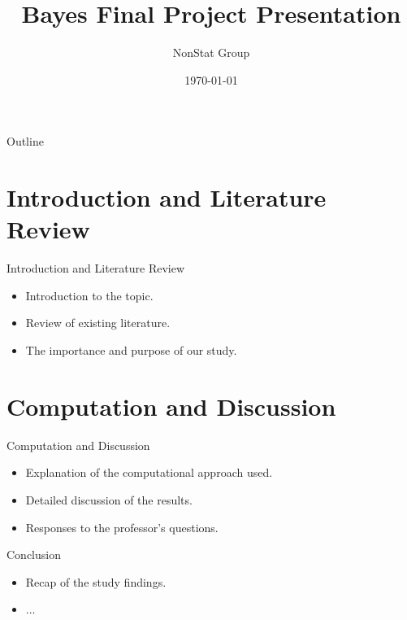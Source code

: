 \documentclass{beamer}
\title[Final Presentation]{Bayes Final Project Presentation}
\author[NonStat]{NonStat Group}
\date{\today}
\begin{document}
\begin{frame}
\titlepage
\end{frame}

\begin{frame}{Outline}
\tableofcontents
\end{frame}

\section{Introduction and Literature Review}
\begin{frame}{Introduction and Literature Review}
\begin{itemize}
\item Introduction to the topic.
\item Review of existing literature.
\item The importance and purpose of our study.
\end{itemize}
\end{frame}

\section{Computation and Discussion}
\begin{frame}{Computation and Discussion}
\begin{itemize}
\item Explanation of the computational approach used.
\item Detailed discussion of the results.
\item Responses to the professor's questions.
\end{itemize}
\end{frame}

\begin{frame}{Conclusion}
\begin{itemize}
\item Recap of the study findings.
\item ...
\end{itemize}
\end{frame}
\end{document}
